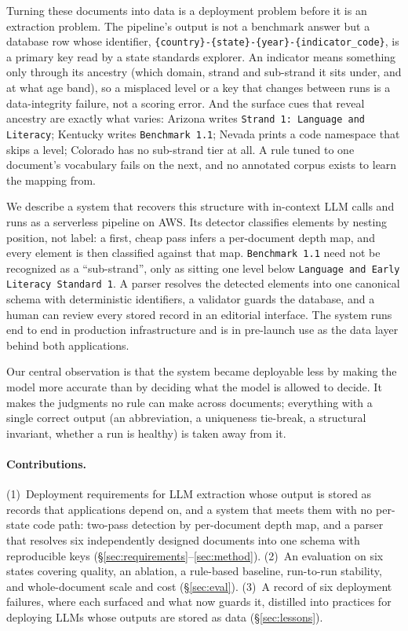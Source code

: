 \documentclass[letterpaper]{article} %
\begin{document}
Turning these documents into data is a deployment problem before it is an
extraction problem. The pipeline's output is not a benchmark answer but a
database row whose identifier,
\texttt{\{country\}-\{state\}-\{year\}-}\allowbreak\texttt{\{indicator\_code\}},
is a primary key
read by a state standards explorer. An
indicator means something only through its ancestry (which domain, strand and
sub-strand it sits under, and at what age band), so a misplaced level or a key
that changes between runs is a data-integrity failure, not a scoring error.
And the surface cues that reveal ancestry are exactly what varies: Arizona
writes \texttt{Strand 1: Language and Literacy}; Kentucky writes
\texttt{Benchmark 1.1}; Nevada prints a code namespace that skips a level;
Colorado has no sub-strand tier at all. A rule tuned to one document's
vocabulary fails on the next, and no annotated corpus exists to learn the
mapping from.

We describe a system that recovers this structure with in-context LLM calls
and runs as a serverless pipeline on AWS. Its detector classifies elements by
nesting position, not label: a first, cheap pass infers a per-document depth
map, and every element is then classified against that map.
\texttt{Benchmark 1.1} need not be recognized as a ``sub-strand'', only as
sitting one level below \texttt{Language and Early Literacy Standard 1}. A
parser resolves the detected elements into one canonical schema with
deterministic identifiers, a validator guards the database, and a human can
review every stored record in an editorial interface. The system runs end to
end in production infrastructure and is in pre-launch use as the data layer
behind both applications.

Our central observation is that the system became deployable less by making
the model more accurate than by deciding what the model is allowed to decide.
It makes the judgments no rule can make across documents; everything with a
single correct output (an abbreviation, a uniqueness tie-break, a structural
invariant, whether a run is healthy) is taken away from it.

\paragraph{Contributions.} (1)~Deployment requirements for LLM extraction
whose output is stored as records that applications depend on, and a system that meets them with no
per-state code path: two-pass detection by per-document depth map, and a
parser that resolves six independently designed documents into one schema
with reproducible keys (\S\ref{sec:requirements}--\ref{sec:method}).
(2)~An evaluation on six states covering quality, an ablation, a rule-based
baseline, run-to-run stability, and whole-document scale and cost
(\S\ref{sec:eval}). (3)~A record of six deployment failures, where each
surfaced and what now guards it, distilled into practices for deploying LLMs
whose outputs are stored as data (\S\ref{sec:lessons}).
\end{document}
